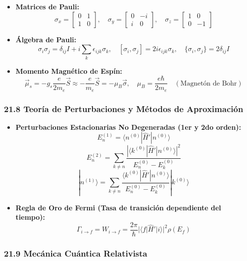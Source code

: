 \documentclass[11pt,a4paper]{article}
\begin{document}
\begin{itemize}
  \item \textbf{Matrices de Pauli:}
  \[
    \sigma_x = \begin{bmatrix} 0 & 1 \\ 1 & 0 \end{bmatrix}, \quad \sigma_y = \begin{bmatrix} 0 & -i \\ i & 0 \end{bmatrix}, \quad \sigma_z = \begin{bmatrix} 1 & 0 \\ 0 & -1 \end{bmatrix}
  \]
  \item \textbf{Álgebra de Pauli:}
  \[
    \sigma_i \sigma_j = \delta_{ij} I + i \sum_k \epsilon_{ijk} \sigma_k, \quad [\sigma_i, \sigma_j] = 2i \epsilon_{ijk} \sigma_k, \quad \{\sigma_i, \sigma_j\} = 2\delta_{ij} I
  \]
  \item \textbf{Momento Magnético de Espín:}
  \[
    \vec{\mu}_s = -g_s \frac{e}{2m_e}\vec{S} \approx -\frac{e}{m_e}\vec{S} = -\mu_B \vec{\sigma}, \quad \mu_B = \frac{e\hbar}{2m_e} \quad (\text{Magnetón de Bohr})
  \]
\end{itemize}

\subsubsection*{21.8 Teoría de Perturbaciones y Métodos de Aproximación}

\begin{itemize}
  \item \textbf{Perturbaciones Estacionarias No Degeneradas (1er y 2do orden):}
  \[
    E_n^{(1)} = \langle n^{(0)} | \hat{H}' | n^{(0)} \rangle
  \]
  \[
    E_n^{(2)} = \sum_{k \neq n} \frac{|\langle k^{(0)} | \hat{H}' | n^{(0)} \rangle|^2}{E_n^{(0)} - E_k^{(0)}}
  \]
  \[
    |n^{(1)}\rangle = \sum_{k \neq n} \frac{\langle k^{(0)} | \hat{H}' | n^{(0)} \rangle}{E_n^{(0)} - E_k^{(0)}} |k^{(0)}\rangle
  \]
  \item \textbf{Regla de Oro de Fermi (Tasa de transición dependiente del tiempo):}
  \[
    \Gamma_{i \to f} = W_{i \to f} = \frac{2\pi}{\hbar} |\langle f | \hat{H}' | i \rangle|^2 \rho(E_f)
  \]
\end{itemize}

\subsubsection*{21.9 Mecánica Cuántica Relativista}
\end{document}

